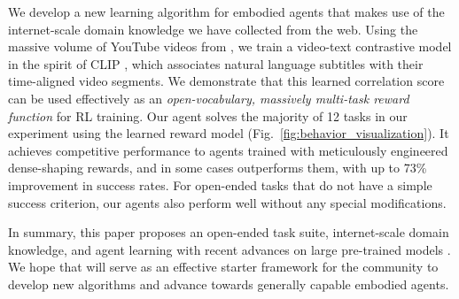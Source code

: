 
We develop a new learning algorithm for embodied agents that makes use of the internet-scale domain knowledge we have collected from the web. Using the massive volume of YouTube videos from \minedojo, we train a video-text contrastive model in the spirit of CLIP \cite{radford2021clip}, which associates natural language subtitles with their time-aligned video segments. 
We demonstrate that this learned correlation score can be used effectively as an \textit{open-vocabulary, massively multi-task reward function} for RL training. Our agent solves the majority of 12 tasks in our experiment using the learned reward model (Fig.~\ref{fig:behavior_visualization}). It achieves competitive performance to agents trained with meticulously engineered dense-shaping rewards, and in some cases outperforms them, with up to 73\% improvement in success rates. For open-ended tasks that do not have a simple success criterion, our agents also perform well without any special modifications.

In summary, this paper proposes an open-ended task suite, internet-scale domain knowledge, and agent learning with recent advances on large pre-trained models \cite{bommasani2021foundation}.  We hope that \minedojo will serve as an effective starter framework for the community to develop new algorithms and advance towards generally capable embodied agents. 



